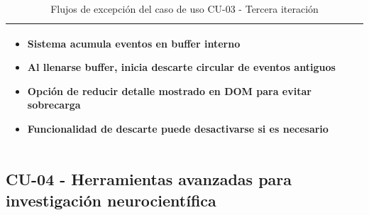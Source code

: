 \begin{table}[H]
{\begin{tabular}{|p{3cm}|p{11cm}|}
\begin{minipage}[t]{10.5cm}
\begin{itemize}
    \item Sistema acumula eventos en buffer interno
    \item Al llenarse buffer, inicia descarte circular de eventos antiguos
    \item Opción de reducir detalle mostrado en DOM para evitar sobrecarga
    \item Funcionalidad de descarte puede desactivarse si es necesario
\end{itemize}
\end{minipage} \\
\hline
\end{tabular}
}
\caption{Flujos de excepción del caso de uso CU-03 - Tercera iteración}
\label{tab:cu03_it3_flujos_excepcion}
\end{table}

\subsection[CU-04 - Herramientas avanzadas para investigación]{CU-04 - Herramientas avanzadas para investigación neurocientífica}
\label{subsec:cu04_it3_investigacion_avanzada}

